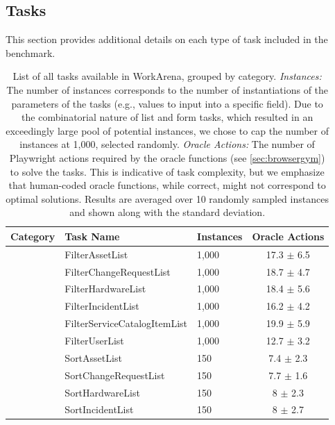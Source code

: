 \documentclass{article}
\theoremstyle{plain}
\theoremstyle{definition}
\theoremstyle{remark}
\begin{document}
\subsection{Tasks} \label{app:wa-tasks}

This section provides additional details on each type of task included in the benchmark.


\begin{table}[htb]
    \centering
    \footnotesize
    \setlength{\tabcolsep}{12pt}
    \caption{List of all tasks available in WorkArena, grouped by category. \emph{Instances:} The number of instances corresponds to the number of instantiations of the parameters of the tasks (e.g., values to input into a specific field). Due to the combinatorial nature of list and form tasks, which resulted in an exceedingly large pool of potential instances, we chose to cap the number of instances at 1,000, selected randomly. \emph{Oracle Actions:} The number of Playwright actions required by the oracle functions (see \cref{sec:browsergym}) to solve the tasks. This is indicative of task complexity, but we emphasize that human-coded oracle functions, while correct, might not correspond to optimal solutions. Results are averaged over 10 randomly sampled instances and shown along with the standard deviation.}
    \label{tab:workarena_all_tasks}
    \begin{tabular}{@{}cMp{1in}c@{}}
        \toprule
        {\bf Category} & {\bf Task Name} & {\bf Instances} & {\bf Oracle Actions} \\
        \midrule
         & FilterAssetList & 1,000 & 17.3 $\pm$ 6.5\\
        & FilterChangeRequestList & 1,000 & 18.7 $\pm$ 4.7\\
        & FilterHardwareList & 1,000 & 18.4 $\pm$ 5.6\\
        & FilterIncidentList & 1,000 & 16.2 $\pm$ 4.2\\
        & FilterServiceCatalogItemList & 1,000 & 19.9 $\pm$ 5.9\\
        & FilterUserList & 1,000 & 12.7 $\pm$ 3.2\\
        & SortAssetList & 150 & 7.4 $\pm$ 2.3\\
        & SortChangeRequestList & 150 & 7.7 $\pm$ 1.6\\
        & SortHardwareList & 150 & 8 $\pm$ 2.3\\
        & SortIncidentList & 150 & 8 $\pm$ 2.7\\

\end{tabular}
\end{table}
\end{document}
